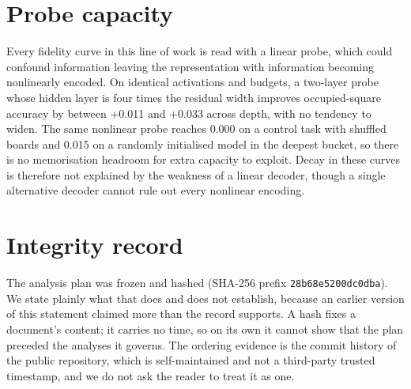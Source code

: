\documentclass[11pt]{article}
\begin{document}
\appendix

\section{Probe capacity}
\label{app:capacity}

Every fidelity curve in this line of work is read with a linear probe, which could
confound information leaving the representation with information becoming
nonlinearly encoded. On identical activations and budgets, a two-layer probe whose
hidden layer is four times the residual width improves occupied-square accuracy by
between
+0.011 and +0.033 across depth, with no tendency to widen.
The same nonlinear probe reaches 0.000 on a control task with
shuffled boards and 0.015 on a randomly initialised model in the
deepest bucket, so there is no memorisation headroom for extra capacity to exploit.
Decay in these curves is therefore not explained by the weakness of a linear
decoder, though a single alternative decoder cannot rule out every nonlinear
encoding.

\section{Integrity record}
\label{app:integrity}

The analysis plan was frozen and hashed (SHA-256 prefix \texttt{28b68e5200dc0dba}).
We state plainly what that does and does not establish, because an earlier version of
this statement claimed more than the record supports. A hash fixes a document's
content; it carries no time, so on its own it cannot show that the plan preceded the
analyses it governs. The ordering evidence is the commit history of the public
repository, which is self-maintained and not a third-party trusted timestamp, and we
do not ask the reader to treat it as one.
\end{document}
